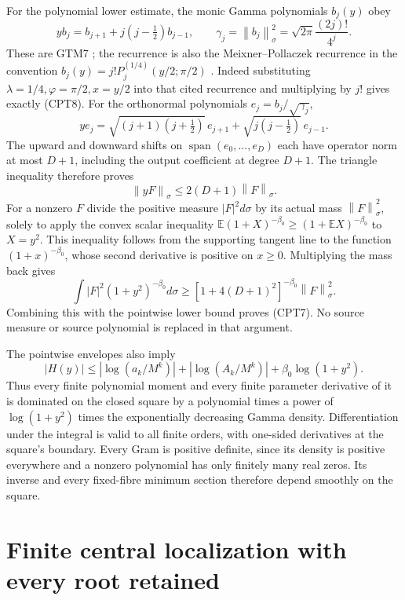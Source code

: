 \documentclass[11pt]{article}
\newcommand{\norm}[1]{\left\lVert#1\right\rVert}
\begin{document}
For the polynomial lower estimate, the monic Gamma polynomials
\(b_j(y)\) obey
\begin{equation}\tag{CPT8}
 yb_j=b_{j+1}+j(j-\tfrac12)b_{j-1},\qquad
 \gamma_j=\norm{b_j}_\sigma^2
 =\sqrt{2\pi}\frac{(2j)!}{4^j}.
\end{equation}
These are GTM7 \cite{providers}; the recurrence is also the
Meixner--Pollaczek recurrence in the convention
\(b_j(y)=j!P_j^{(1/4)}(y/2;\pi/2)\)
\cite[(18.22.8)]{dlmfMP}.  Indeed substituting
\(\lambda=1/4,\varphi=\pi/2,x=y/2\) into that cited recurrence and
multiplying by \(j!\) gives exactly (CPT8).
For the orthonormal polynomials \(e_j=b_j/\sqrt{\gamma_j}\),
\[
 ye_j=\sqrt{(j+1)(j+\tfrac12)}\,e_{j+1}
       +\sqrt{j(j-\tfrac12)}\,e_{j-1}.
\]
The upward and downward shifts on
\(\operatorname{span}(e_0,\ldots,e_D)\) each have operator norm at
most \(D+1\), including the output coefficient at degree \(D+1\).
The triangle inequality therefore proves
\[
 \norm{yF}_\sigma\le2(D+1)\norm{F}_\sigma.
\]
For a nonzero \(F\) divide the positive measure
\(|F|^2d\sigma\) by its actual mass \(\norm{F}_\sigma^2\), solely
to apply the convex scalar inequality
\(\mathbb E(1+X)^{-\beta_0}\ge(1+\mathbb EX)^{-\beta_0}\)
to \(X=y^2\).  This inequality follows from the supporting tangent
line to the function \((1+x)^{-\beta_0}\), whose second derivative
is positive on \(x\ge0\).  Multiplying the mass back gives
\[
 \int |F|^2(1+y^2)^{-\beta_0}d\sigma
 \ge[1+4(D+1)^2]^{-\beta_0}\norm{F}_\sigma^2.
\]
Combining this with the pointwise lower bound proves (CPT7).
No source measure or source polynomial is replaced in that argument.

The pointwise envelopes also imply
\[
 |H(y)|\le
 |\log(a_k/M^k)|+|\log(A_k/M^k)|
       +\beta_0\log(1+y^2).
\]
Thus every finite polynomial moment and every finite parameter
derivative of it is dominated on the closed square by a polynomial
times a power of \(\log(1+y^2)\) times the exponentially decreasing
Gamma density.  Differentiation under the integral is valid to all
finite orders, with one-sided derivatives at the square's boundary.
Every Gram is positive definite, since its density is positive
everywhere and a nonzero polynomial has only finitely many real
zeros.  Its inverse and every fixed-fibre minimum section therefore
depend smoothly on the square.

\section{Finite central localization with every root retained}
\label{sec:localization}
\end{document}
